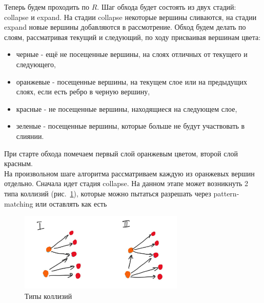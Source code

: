 \begin{algo}
Теперь будем проходить по $R$. Шаг обхода будет состоять из двух стадий: collapse и expand. На стадии collapse некоторые вершины сливаются, на стадии expand новые вершины добавляются в рассмотрение. Обход будем делать по слоям, рассматривая текущий и следующий, по ходу присваивая вершинам цвета:\\
\begin{itemize}
    \item черные - ещё не посещенные вершины, на слоях отличных от текущего и следующего,
    \item оранжевые - посещенные вершины, на текущем слое или на предыдущих слоях, если есть ребро в черную вершину,
    \item красные - не посещенные вершины, находящиеся на следующем слое,
    \item зеленые - посещенные вершины, которые больше не будут участвовать в слиянии.
\end{itemize}
При старте обхода помечаем первый слой оранжевым цветом, второй слой красным.\\
На произвольном шаге алгоритма рассматриваем каждую из оранжевых вершин отдельно. Сначала идет стадия collapse. На данном этапе может возникнуть 2 типа коллизий (рис.~\ref{fig:collision}), которые можно пытаться разрешать через pattern-matching или оставлять как есть\\
\begin{figure}[h]
    \centering
    \includegraphics[width=0.7\textwidth]{img/collision.jpeg}
    \caption{Типы коллизий}
    \label{fig:collision}
\end{figure}


\end{algo}
